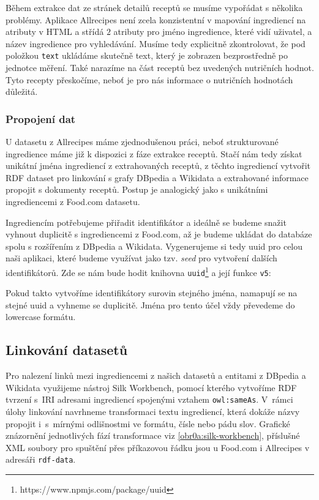 Během extrakce dat ze stránek detailů receptů se musíme vypořádat s několika problémy. Aplikace Allrecipes není zcela konzistentní v mapování ingrediencí na atributy v HTML a střídá $2$ atributy pro jméno ingredience, které vidí uživatel, a název ingredience pro vyhledávání. Musíme tedy explicitně zkontrolovat, že pod položkou \texttt{text} ukládáme skutečně text, který je zobrazen bezprostředně po jednotce měření. Také narazíme na část receptů bez uvedených nutričních hodnot. Tyto recepty přeskočíme, neboť je pro nás informace o nutričních hodnotách důležitá.

\subsubsection{Propojení dat}

U datasetu z Allrecipes máme zjednodušenou práci, neboť strukturované ingredience máme již k dispozici z fáze extrakce receptů. Stačí nám tedy získat unikátní jména ingrediencí z extrahovaných receptů, z těchto ingrediencí vytvořit RDF dataset pro linkování s grafy DBpedia a Wikidata a extrahované informace propojit s dokumenty receptů. Postup je analogický jako s unikátními ingrediencemi z Food.com datasetu. 

Ingrediencím potřebujeme přiřadit identifikátor a ideálně se budeme snažit vyhnout duplicitě s ingrediencemi z Food.com, až je budeme ukládat do databáze spolu s rozšířením z DBpedia a Wikidata. Vygenerujeme si tedy uuid pro celou naši aplikaci, které budeme využívat jako tzv. \emph{seed} pro vytvoření dalších identifikátorů. Zde se nám bude hodit knihovna \texttt{uuid}\footnote{https://www.npmjs.com/package/uuid} a její funkce \texttt{v5}:
\begin{code}
uuid.v5(name, NAMESPACE_UUID)}
\end{code}
Pokud takto vytvoříme identifikátory surovin stejného jména, namapují se na stejné uuid a vyhneme se duplicitě. Jména pro tento účel vždy převedeme do lowercase formátu.

\subsection{Linkování datasetů}

Pro nalezení linků mezi ingrediencemi z našich datasetů a entitami z DBpedia a Wikidata využijeme nástroj Silk Workbench, pomocí kterého vytvoříme RDF tvrzení s~IRI adresami ingrediencí spojenými vztahem \texttt{owl:sameAs}. V~rámci úlohy linkování navrhneme transformaci textu ingrediencí, která dokáže názvy propojit i~s~mírnými odlišnostmi ve formátu, čísle nebo pádu slov. Grafické znázornění jednotlivých fází transformace viz \ref{obr0a:silk-workbench}, příslušné XML soubory pro spuštění přes příkazovou řádku jsou u Food.com i Allrecipes v adresáři \texttt{rdf-data}.

